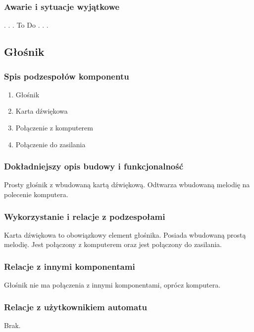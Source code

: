 \documentclass[12pt,a4paper,notitlepage]{report}
\begin{document}
\normalsize

\subsubsection{Awarie i sytuacje wyjątkowe}
. . . To Do . . .



\subsection{Głośnik}
\subsubsection{Spis podzespołów komponentu}
\begin{enumerate}
  \item Głośnik
  \item Karta dźwiękowa
  \item Połączenie z komputerem
  \item Połączenie do zasilania
\end{enumerate}

\subsubsection{Dokładniejszy opis budowy i funkcjonalność}
Prosty głośnik z wbudowaną kartą dźwiękową. Odtwarza wbudowaną melodię na polecenie komputera.
 
\subsubsection{Wykorzystanie i relacje z podzespołami}
Karta dźwiękowa to obowiązkowy element głośnika. Posiada wbudowaną prostą melodię. Jest połączony z komputerem oraz jest połączony do zasilania.

\subsubsection{Relacje z innymi komponentami}
Głośnik nie ma połączenia z innymi komponentami, oprócz komputera.

\subsubsection{Relacje z użytkownikiem automatu}
Brak.

\end{document}
